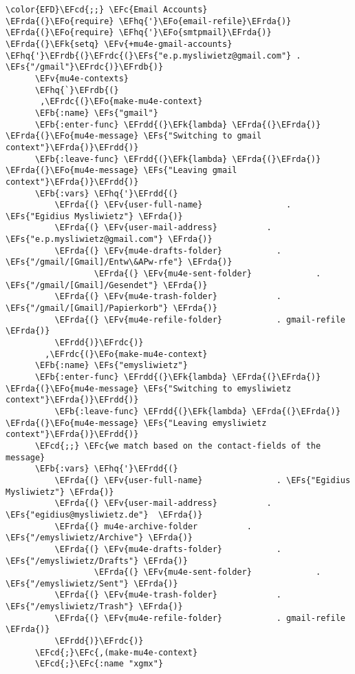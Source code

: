 \documentclass[a4wide,10pt]{article}
\newcommand{\EFc}[1]{\textcolor{EFc}{#1}} %
\newcommand{\EFcd}[1]{\textcolor{EFcd}{#1}} %
\newcommand{\EFs}[1]{\textcolor{EFs}{#1}} %
\newcommand{\EFk}[1]{\textcolor{EFk}{#1}} %
\newcommand{\EFb}[1]{\textcolor{EFb}{#1}} %
\newcommand{\EFv}[1]{\textcolor{EFv}{#1}} %
\newcommand{\EFo}[1]{\textcolor{EFo}{#1}} %
\newcommand{\EFhq}[1]{\textcolor{EFhq}{#1}} %
\newcommand{\EFrda}[1]{\textcolor{EFrda}{#1}} %
\newcommand{\EFrdb}[1]{\textcolor{EFrdb}{#1}} %
\newcommand{\EFrdc}[1]{\textcolor{EFrdc}{#1}} %
\newcommand{\EFrdd}[1]{\textcolor{EFrdd}{#1}} %
\begin{document}
\begin{Code}
\begin{Verbatim}
\color{EFD}\EFcd{;;} \EFc{Email Accounts}
\EFrda{(}\EFo{require} \EFhq{'}\EFo{email-refile}\EFrda{)}
\EFrda{(}\EFo{require} \EFhq{'}\EFo{smtpmail}\EFrda{)}
\EFrda{(}\EFk{setq} \EFv{+mu4e-gmail-accounts} \EFhq{'}\EFrdb{(}\EFrdc{(}\EFs{"e.p.mysliwietz@gmail.com"} . \EFs{"/gmail"}\EFrdc{)}\EFrdb{)}
      \EFv{mu4e-contexts}
      \EFhq{`}\EFrdb{(}
       ,\EFrdc{(}\EFo{make-mu4e-context}
	  \EFb{:name} \EFs{"gmail"}
	  \EFb{:enter-func} \EFrdd{(}\EFk{lambda} \EFrda{(}\EFrda{)} \EFrda{(}\EFo{mu4e-message} \EFs{"Switching to gmail context"}\EFrda{)}\EFrdd{)}
	  \EFb{:leave-func} \EFrdd{(}\EFk{lambda} \EFrda{(}\EFrda{)} \EFrda{(}\EFo{mu4e-message} \EFs{"Leaving gmail context"}\EFrda{)}\EFrdd{)}
	  \EFb{:vars} \EFhq{'}\EFrdd{(}
		  \EFrda{(} \EFv{user-full-name}	             . \EFs{"Egidius Mysliwietz"} \EFrda{)}
		  \EFrda{(} \EFv{user-mail-address}	         . \EFs{"e.p.mysliwietz@gmail.com"} \EFrda{)}
		  \EFrda{(} \EFv{mu4e-drafts-folder}           . \EFs{"/gmail/[Gmail]/Entw\&APw-rfe"} \EFrda{)}
                  \EFrda{(} \EFv{mu4e-sent-folder}             . \EFs{"/gmail/[Gmail]/Gesendet"} \EFrda{)}
		  \EFrda{(} \EFv{mu4e-trash-folder}            . \EFs{"/gmail/[Gmail]/Papierkorb"} \EFrda{)}
		  \EFrda{(} \EFv{mu4e-refile-folder}           . gmail-refile \EFrda{)}
		  \EFrdd{)}\EFrdc{)}
        ,\EFrdc{(}\EFo{make-mu4e-context}
	  \EFb{:name} \EFs{"emysliwietz"}
	  \EFb{:enter-func} \EFrdd{(}\EFk{lambda} \EFrda{(}\EFrda{)} \EFrda{(}\EFo{mu4e-message} \EFs{"Switching to emysliwietz context"}\EFrda{)}\EFrdd{)}
          \EFb{:leave-func} \EFrdd{(}\EFk{lambda} \EFrda{(}\EFrda{)} \EFrda{(}\EFo{mu4e-message} \EFs{"Leaving emysliwietz context"}\EFrda{)}\EFrdd{)}
	  \EFcd{;;} \EFc{we match based on the contact-fields of the message}
	  \EFb{:vars} \EFhq{'}\EFrdd{(}
		  \EFrda{(} \EFv{user-full-name}               . \EFs{"Egidius Mysliwietz"} \EFrda{)}
		  \EFrda{(} \EFv{user-mail-address}	         . \EFs{"egidius@mysliwietz.de"}  \EFrda{)}
		  \EFrda{(} mu4e-archive-folder          . \EFs{"/emysliwietz/Archive"} \EFrda{)}
		  \EFrda{(} \EFv{mu4e-drafts-folder}           . \EFs{"/emysliwietz/Drafts"} \EFrda{)}
                  \EFrda{(} \EFv{mu4e-sent-folder}             . \EFs{"/emysliwietz/Sent"} \EFrda{)}
		  \EFrda{(} \EFv{mu4e-trash-folder}            . \EFs{"/emysliwietz/Trash"} \EFrda{)}
		  \EFrda{(} \EFv{mu4e-refile-folder}           . gmail-refile \EFrda{)}
		  \EFrdd{)}\EFrdc{)}
      \EFcd{;}\EFc{,(make-mu4e-context}
	  \EFcd{;}\EFc{:name "xgmx"}

\end{Verbatim}
\end{Code}
\end{document}
